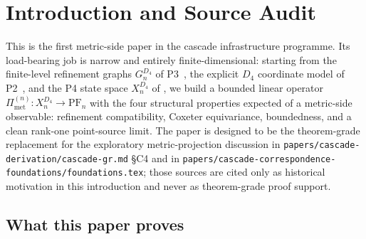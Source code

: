\documentclass[11pt, a4paper]{amsart}
\theoremstyle{definition}
\newcommand{\Met}{\mathrm{met}}
\newcommand{\PF}{\mathrm{PF}}
\newcommand{\Pimet}{\Pi_{\Met}}
\begin{document}
\begin{abstract}
The paper is finite-level only. We prove no continuum metric,
Riemannian limit, Lorentzian structure, Einstein equation,
stress-energy, perfect-fluid, hydrodynamic, Navier--Stokes, or
general-relativistic statement. Convergence under refinement,
Gromov--Hausdorff limits, and spectral stability of graph
Laplacians are the target of paper P6 and are out of scope here.
\end{abstract}

\tableofcontents

\section{Introduction and Source Audit}
\label{sec:intro}

This is the first metric-side paper in the cascade infrastructure
programme. Its load-bearing job is narrow and entirely
finite-dimensional: starting from the finite-level refinement
graphs $G_n^{D_4}$ of P3~\cite{RefinementSpaces}, the explicit
$D_4$ coordinate model of P2~\cite{AlgebraicSubstrate}, and the
P4 state space $X_n^{D_4}$ of \cite{ClosureDynamics}, we build a
bounded linear operator $\Pimet^{(n)} \colon X_n^{D_4} \to \PF_n$
with the four structural properties expected of a metric-side
observable: refinement compatibility, Coxeter equivariance,
boundedness, and a clean rank-one point-source limit. The paper
is designed to be the theorem-grade replacement for the
exploratory metric-projection discussion in
\texttt{papers/cascade-derivation/cascade-gr.md} \S C4 and in
\texttt{papers/cascade-correspondence-foundations/foundations.tex};
those sources are cited only as historical motivation in this
introduction and never as theorem-grade proof support.

\subsection{What this paper proves}
\end{document}
